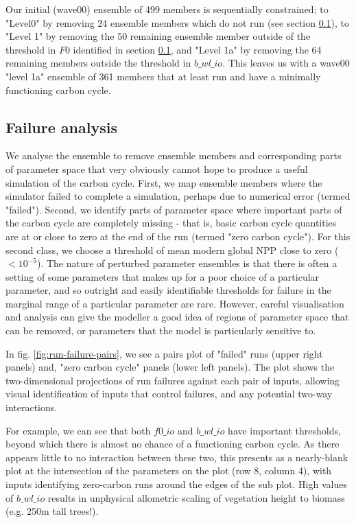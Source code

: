 \documentclass[gmd, manuscript]{copernicus}
\begin{document}
Our initial (wave00) ensemble of 499 members is sequentially constrained; to "Level0" by removing 24 ensemble members which do not run (see section \ref{ssec:failure-analysis}), to "Level 1" by removing the 50 remaining ensemble member outside of the threshold in $F0$ identified in section \ref{ssec:failure-analysis}, and "Level 1a" by removing the 64 remaining members outside the threshold in $b\_wl\_io$. This leaves us with a wave00 "level 1a" ensemble of 361 members that at least run and have a minimally functioning carbon cycle.

\subsection{Failure analysis}\label{ssec:failure-analysis}

We analyse the ensemble to remove ensemble members and corresponding parts of parameter space that very obviously cannot hope to produce a useful simulation of the carbon cycle. First, we map ensemble members where the simulator failed to complete a simulation, perhaps due to numerical error (termed "failed"). Second, we identify parts of parameter space where important parts of the carbon cycle are completely missing - that is, basic carbon cycle quantities are at or close to zero at the end of the run (termed "zero carbon cycle"). For this second class, we choose a threshold of mean modern global NPP close to zero ($<10^{-5}$).
The nature of perturbed parameter ensembles is that there is often a setting of some parameters that makes up for a poor choice of a particular parameter, and so outright and easily identifiable thresholds for failure in the marginal range of a particular parameter are rare. However, careful visualisation and analysis can give the modeller a good idea of regions of parameter space that can be removed, or parameters that the model is particularly sensitive to.

In fig. \ref{fig:run-failure-pairs}, we see a pairs plot of "failed" runs (upper right panels) and, "zero carbon cycle" panels (lower left panels). The plot shows the two-dimensional projections of run failures against each pair of inputs, allowing visual identification of inputs that control failures, and any potential two-way interactions.

For example, we can see that both $f0\_io$ and $b\_wl\_io$ have important thresholds, beyond which there is almost no chance of a functioning carbon cycle. As there appears little to no interaction between these two, this presents as a nearly-blank plot at the intersection of the parameters on the plot (row 8, column 4), with inputs identifying zero-carbon runs around the edges of the sub plot. High values of $b\_wl\_io$ results in unphysical allometric scaling of vegetation height to biomass (e.g. 250m tall trees!).
\end{document}

